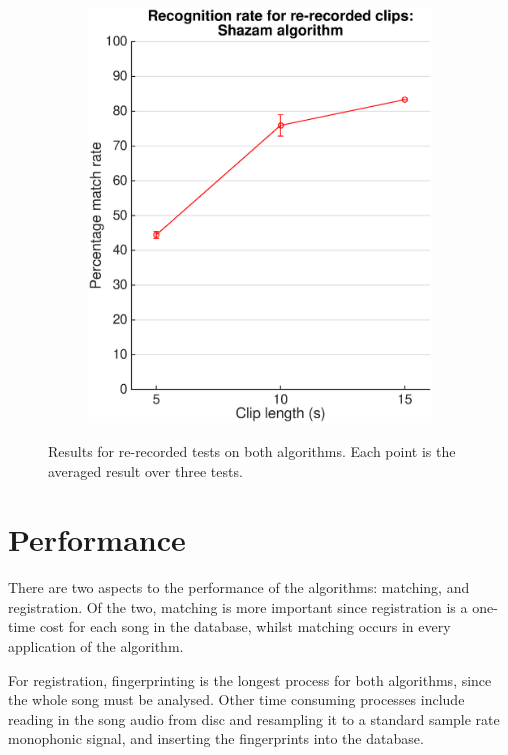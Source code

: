 \documentclass[12pt,a4paper,twoside,openright]{report}
\begin{document}
\begin{figure}[htbp!]
\begin{subfigure}{0.5\textwidth}
     	\includegraphics[width=0.95\linewidth]{./figs/constellation_passthrough.eps} 
    \end{subfigure}

    \caption{Results for re-recorded tests on both algorithms. Each point is the averaged result over three tests.}
    \label{fig:re-recorded_results}
\end{figure}

\section{Performance}

There are two aspects to the performance of the algorithms: matching, and registration. Of the two, matching is more important since registration is a one-time cost for each song in the database, whilst matching occurs in every application of the algorithm. 

For registration, fingerprinting is the longest process for both algorithms, since the whole song must be analysed. Other time consuming processes include reading in the song audio from disc and resampling it to a standard sample rate monophonic signal, and inserting the fingerprints into the database.
\end{document}
